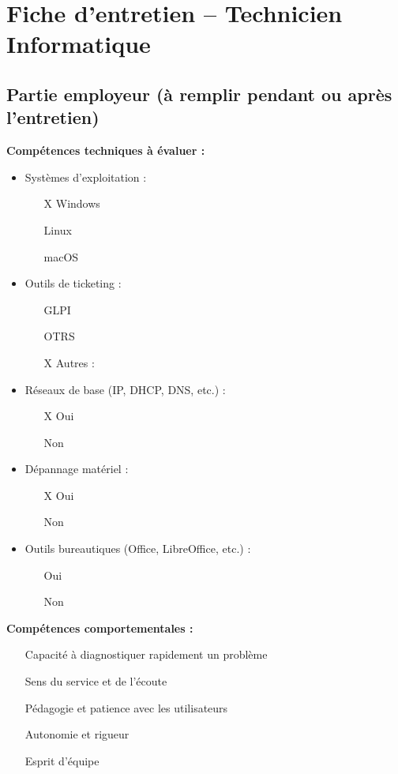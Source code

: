 \documentclass[12pt]{article}
\begin{document}
\section*{Fiche d'entretien – Technicien Informatique}

\subsection*{Partie employeur (à remplir pendant ou après l’entretien)}

\textbf{Compétences techniques à évaluer :}
\begin{itemize}
    \item Systèmes d’exploitation :
    \begin{itemize}
        \item [X] Windows \checkmark
        \item [] Linux \checkmark
        \item [] macOS
    \end{itemize}
    \item Outils de ticketing :
    \begin{itemize}
        \item [] GLPI
        \item [] OTRS
        \item [X] Autres : \checkmark
    \end{itemize}
    \item Réseaux de base (IP, DHCP, DNS, etc.) :
    \begin{itemize}
        \item [X] Oui \checkmark
        \item [] Non
    \end{itemize}
    \item Dépannage matériel :
    \begin{itemize}
        \item [X] Oui \checkmark
        \item [] Non
    \end{itemize}
    \item Outils bureautiques (Office, LibreOffice, etc.) :
    \begin{itemize}
        \item [] Oui
        \item [] Non
    \end{itemize}
\end{itemize}

\textbf{Compétences comportementales :}
\begin{itemize}
    \item [] Capacité à diagnostiquer rapidement un problème \checkmark
    \item [] Sens du service et de l’écoute \checkmark
    \item [] Pédagogie et patience avec les utilisateurs \checkmark
    \item [] Autonomie et rigueur \checkmark
    \item [] Esprit d’équipe   \checkmark
\end{itemize}
\end{document}

